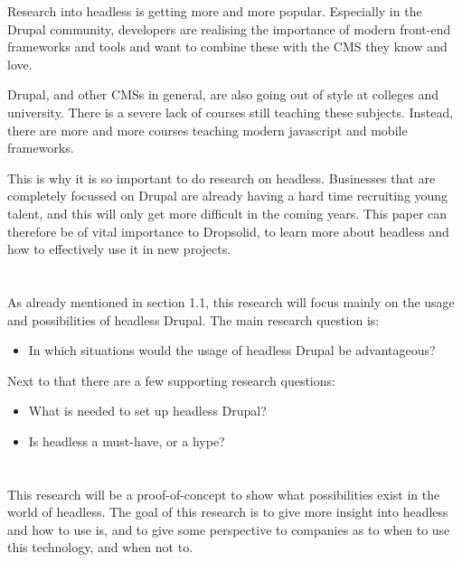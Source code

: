 Research into headless is getting more and more popular. Especially in the Drupal community, developers are realising the importance of modern front-end frameworks and tools and want to combine these with the CMS they know and love. 

Drupal, and other CMSs in general, are also going out of style at colleges and university. There is a severe lack of courses still teaching these subjects. Instead, there are more and more courses teaching modern javascript and mobile frameworks.


This is why it is so important to do research on headless. Businesses that are completely focussed on Drupal are already having a hard time recruiting young talent, and this will only get more difficult in the coming years. This paper can therefore be of vital importance to Dropsolid, to learn more about headless and how to effectively use it in new projects.

\section{}
\label{sec:onderzoeksvraag}

As already mentioned in section 1.1, this research will focus mainly on the usage and possibilities of headless Drupal. The main research question is:
\begin{itemize}
	\item In which situations would the usage of headless Drupal be advantageous?
\end{itemize}

Next to that there are a few supporting research questions:
\begin{itemize}
	\item What is needed to set up headless Drupal?
	\item Is headless a must-have, or a hype?
\end{itemize}

\section{}
\label{sec:onderzoeksdoelstelling}

This research will be a proof-of-concept to show what possibilities exist in the world of headless. The goal of this research is to give more insight into headless and how to use is, and to give some perspective to companies as to when to use this technology, and when not to.

